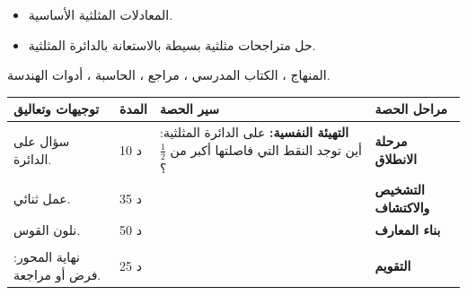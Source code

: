 \documentclass[12pt,a4paper]{article}
\newenvironment{LTR}{\begin{otherlanguage}{english}}{\end{otherlanguage}}
\newcommand{\ar}[1]{\foreignlanguage{arabic}{#1}}
\newcommand{\Phase}[1]{\textbf{#1}}
\newenvironment{Sayr}{%
\begin{LTR}\renewcommand{\arraystretch}{1.25}
\begin{longtable}{|p{0.17\textwidth}|>{\centering\arraybackslash}p{0.06\textwidth}|p{0.53\textwidth}|>{\centering\arraybackslash}p{0.12\textwidth}|}
\hline\rowcolor{cThm!12}\ar{\textbf{توجيهات وتعاليق}} & \ar{\textbf{المدة}} & \ar{\textbf{سير الحصة}} & \ar{\textbf{مراحل الحصة}}\\\hline\endhead
\hline\endfoot}{\end{longtable}\end{LTR}}
\newcommand{\Row}[4]{\ar{\small #4} & \ar{#3} & \ar{#2} & \cellcolor{cThm!8}\ar{\Phase{#1}}\\\hline}
\newcommand{\Lab}[2]{\foreignlanguage{english}{\tcbox[on line,colback=#1,colframe=#1,boxrule=0pt,arc=2pt,boxsep=1pt,left=5pt,right=5pt,top=1pt,bottom=1pt]{\ar{\textcolor{white}{\textbf{#2}}}}}}
\newcommand{\Num}[1]{\foreignlanguage{english}{\tikz[baseline=(c.base)]\node[fill=cDef,text=white,inner sep=2pt,font=\footnotesize\bfseries](c){#1};}}
\newcommand{\ck}{\ensuremath{{\color{cRem}\checkmark}}}
\begin{document}
{\begin{itemize}\item المعادلات المثلثية الأساسية.\end{itemize}}%
{\begin{itemize}\item حل متراجحات مثلثية بسيطة بالاستعانة بالدائرة المثلثية.\end{itemize}}%
{المنهاج ، الكتاب المدرسي ، مراجع ، الحاسبة ، أدوات الهندسة.}
\begin{Sayr}
\Row{مرحلة الانطلاق}{%
\textbf{التهيئة النفسية:} على الدائرة المثلثية: أين توجد النقط التي فاصلتها أكبر من $\frac12$ ؟}{10 د}{سؤال على الدائرة.}
\Row{التشخيص والاكتشاف}{%
\Lab{cEx}{وضعية مقترحة}\ نحل في $]-\pi;\pi]$: $\cos x\geqslant\frac12$.\par\ck\ نحل أولاً المعادلة $\cos x=\frac12$: $-\frac\pi3$ و $\frac\pi3$.\par
\ck\ النقط التي فاصلتها $\geqslant\frac12$ تقع على القوس الملون.\par
}{35 د}{عمل ثنائي.}
\Row{بناء المعارف}{%
\Lab{cMeth}{طريقة}\ نحل المعادلة المرفقة ، نعلم النقط على الدائرة ، نلون القوس المطلوب ، ثم نقرأ الحلول في المجال المعطى.\par\Lab{cEx}{مثال}\ $\cos x\geqslant\frac12$ في المجال $]-\pi;\pi]$:\par\smallskip\begin{LTR}\centering \begin{tikzpicture}[scale=1.3,font=\scriptsize]
\fill[cDef!25] (0,0)--(60:1) arc (60:-60:1)--cycle;
\draw[->] (-1.3,0)--(1.4,0) node[right]{$\cos$}; \draw[->] (0,-1.3)--(0,1.35) node[above]{$\sin$};
\draw (0,0) circle (1); \draw[cDef,very thick] (60:1) arc (60:-60:1);
\draw[cThm,dashed] (0.5,-1.2)--(0.5,1.2); \node[cThm,above right] at (0.5,1.15){$x=\frac12$};
\fill (60:1) circle (1.3pt) node[above right]{$\frac\pi3$}; \fill (-60:1) circle (1.3pt) node[below right]{$-\frac\pi3$};
\end{tikzpicture}\end{LTR}\par مجموعة الحلول $\left[-\frac\pi3;\frac\pi3\right]$.\par}{50 د}{نلون القوس.}
\Row{}{%
\Lab{cEx}{مثال}\ $\sin x>\frac{\sqrt2}2$ في $[0;2\pi[$: $\left]\frac\pi4;\frac{3\pi}4\right[$.\par\Lab{cThm!80!black}{حذار}\ نتبع اتجاه المجال على الدائرة ، وننتبه للأطراف (مغلقة أو مفتوحة).}{}{}
\Row{التقويم}{%
\Lab{cEx}{تطبيق}\par حل: \Num{1} $\cos x<0$ في $]-\pi;\pi]$ ؛ \Num{2} $\sin x\leqslant\frac12$ في $[0;2\pi[$.\par\textbf{الحل:} \Num{1} $\left]-\pi;-\frac\pi2\right[\cup\left]\frac\pi2;\pi\right]$ ؛ \Num{2} $\left[0;\frac\pi6\right]\cup\left[\frac{5\pi}6;2\pi\right[$.\par\textbf{واجب منزلي:} تمارين 89 ، 90 ، 91 من باب الزوايا الموجهة.\par\smallskip\textbf{ملاحظات حول سير الحصة:} \dotfill}{25 د}{نهاية المحور: فرض أو مراجعة.}
\end{Sayr}
\end{document}
